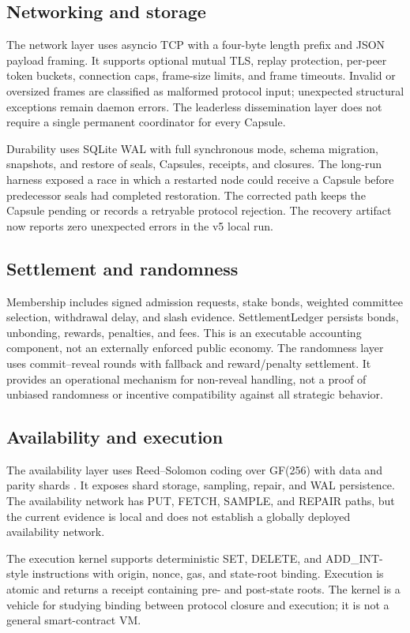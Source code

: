 \documentclass{ledger}
\begin{document}
\subsection{Networking and storage}
The network layer uses asyncio TCP with a four-byte length prefix and JSON payload framing. It supports optional mutual TLS, replay protection, per-peer token buckets, connection caps, frame-size limits, and frame timeouts. Invalid or oversized frames are classified as malformed protocol input; unexpected structural exceptions remain daemon errors. The leaderless dissemination layer does not require a single permanent coordinator for every Capsule.

Durability uses SQLite WAL with full synchronous mode, schema migration, snapshots, and restore of seals, Capsules, receipts, and closures. The long-run harness exposed a race in which a restarted node could receive a Capsule before predecessor seals had completed restoration. The corrected path keeps the Capsule pending or records a retryable protocol rejection. The recovery artifact now reports zero unexpected errors in the v5 local run.

\subsection{Settlement and randomness}
Membership includes signed admission requests, stake bonds, weighted committee selection, withdrawal delay, and slash evidence. SettlementLedger persists bonds, unbonding, rewards, penalties, and fees. This is an executable accounting component, not an externally enforced public economy. The randomness layer uses commit--reveal rounds with fallback and reward/penalty settlement. It provides an operational mechanism for non-reveal handling, not a proof of unbiased randomness or incentive compatibility against all strategic behavior.

\subsection{Availability and execution}
The availability layer uses Reed--Solomon coding over GF(256) with data and parity shards \cite{Reed1960}. It exposes shard storage, sampling, repair, and WAL persistence. The availability network has PUT, FETCH, SAMPLE, and REPAIR paths, but the current evidence is local and does not establish a globally deployed availability network.

The execution kernel supports deterministic SET, DELETE, and ADD\_INT-style instructions with origin, nonce, gas, and state-root binding. Execution is atomic and returns a receipt containing pre- and post-state roots. The kernel is a vehicle for studying binding between protocol closure and execution; it is not a general smart-contract VM.
\end{document}
